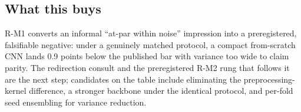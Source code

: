 \subsection{What this buys}
R-M1 converts an informal ``at-par within noise'' impression into a
preregistered, falsifiable negative: under a genuinely matched protocol, a
compact from-scratch CNN lands 0.9 points below the published bar with
variance too wide to claim parity. The redirection consult and the
preregistered R-M2 rung that follows it are the next step; candidates on
the table include eliminating the preprocessing-kernel difference, a
stronger backbone under the identical protocol, and per-fold seed
ensembling for variance reduction.
